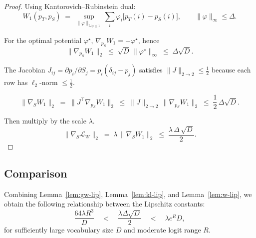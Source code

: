 \documentclass{article}
\begin{document}
\begin{proof}
Using Kantorovich–Rubinstein dual:
\[
   W_{1}(p_{T},p_{S})
   \;=\;
   \sup_{\lVert\varphi\rVert_{\mathrm{Lip}\le1}}
   \sum_{i}\varphi_{i}\bigl[p_{T}(i)-p_{S}(i)\bigr],
   \qquad
   \lVert\varphi\rVert_{\infty}\le\Delta .
\]

For the optimal potential $\varphi^{\star}$,
$\nabla_{p_{S}}W_{1}=-\varphi^{\star}$, hence
\[
  \bigl\lVert\nabla_{p_{S}}W_{1}\bigr\rVert_{2}
  \;\le\;
  \sqrt{D}\,\lVert\varphi^{\star}\rVert_{\infty}
  \;\le\;
  \Delta\sqrt{D}.
\]

The Jacobian
$J_{ij} = \partial p_{i}/\partial S_{j}
        = p_{i}(\delta_{ij}-p_{j})$
satisfies 
$\lVert J\rVert_{2\!\to\!2}\le\tfrac12$
because each row has $\ell_{2}$-norm $\le\frac12$.

\[
  \bigl\lVert\nabla_{S}W_{1}\bigr\rVert_{2}
  \;=\;
  \lVert J^{\!\top}\nabla_{p_{S}}W_{1}\rVert_{2}
  \;\le\;
  \lVert J\rVert_{2\!\to\!2}\,
  \lVert\nabla_{p_{S}}W_{1}\rVert_{2}
  \;\le\;
  \frac12\,\Delta\sqrt{D}.
\]

Then multiply by the scale $\lambda$.
\[
  \bigl\lVert\nabla_{S}\mathcal{L}_{W}\bigr\rVert_{2}
  \;=\;
  \lambda\,\bigl\lVert\nabla_{S}W_{1}\bigr\rVert_{2}
  \;\le\;
  \frac{\lambda\,\Delta\,\sqrt{D}}{2}.
\]
\end{proof}


\subsection{Comparison}
Combining Lemma~\ref{lem:gw-lip}, Lemma~\ref{lem:kl-lip},
and Lemma~\ref{lem:w-lip}, we obtain the following relationship between the Lipschitz constants:
\[
 \frac{64\lambda R^{3}}{D}
  \quad < \quad
  \frac{\lambda\Delta\sqrt{D}}{2}
  \quad < \quad
  \lambda e^{R}D,
\]
for sufficiently large vocabulary size $D$ and moderate logit range $R$.
\end{document}
